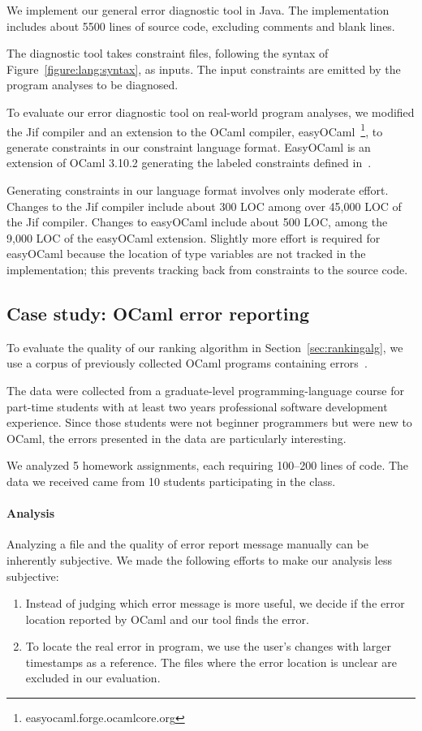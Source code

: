 We implement our general error diagnostic tool in Java. The
implementation includes about 5500 lines of source code, excluding
comments and blank lines.

The diagnostic tool takes constraint files, following the syntax of
Figure~\ref{figure:lang:syntax}, as inputs. The input constraints are
emitted by the program analyses to be diagnosed.

To evaluate our error diagnostic tool on real-world program analyses,
we modified the Jif compiler and an extension to the OCaml compiler,
easyOCaml~\footnote{easyocaml.forge.ocamlcore.org}, to generate
constraints in our constraint language format. EasyOCaml is an
extension of OCaml 3.10.2 generating the labeled constraints defined
in~\cite{haack:slicing}.

Generating constraints in our language format involves only moderate
effort. Changes to the Jif compiler include about 300 LOC among
over 45,000 LOC of the Jif compiler. Changes to easyOCaml include about
500 LOC, among the 9,000 LOC of the easyOCaml extension.  Slightly more
effort is required for easyOCaml because the location of type
variables are not tracked in the implementation; this prevents
tracking back from constraints to the source code.

\subsection{Case study: OCaml error reporting}
\label{sec:ocamleval}

To evaluate the quality of our ranking algorithm in
Section~\ref{sec:rankingalg}, we use a corpus of previously collected
OCaml programs containing errors~\cite{lerner:pldi07}.

The data were collected from a graduate-level programming-language
course for part-time students with at least two years professional
software development experience. Since those students were not
beginner programmers but were new to OCaml, the errors presented in
the data are particularly interesting.

We analyzed 5 homework assignments, each requiring 100--200 lines of
code. The data we received came from 10 students participating in the
class.

\paragraph{Analysis}

Analyzing a file and the quality of error report message manually can
be inherently subjective. We made the following efforts to make our
analysis less subjective:
\begin{enumerate}
\item Instead of judging which error message is more useful, we decide
if the error location reported by OCaml and our tool finds the error.

\item To locate the real error in program, we use the user's changes
with larger timestamps as a reference. The files where the error
location is unclear are excluded in our evaluation.
\end{enumerate}

